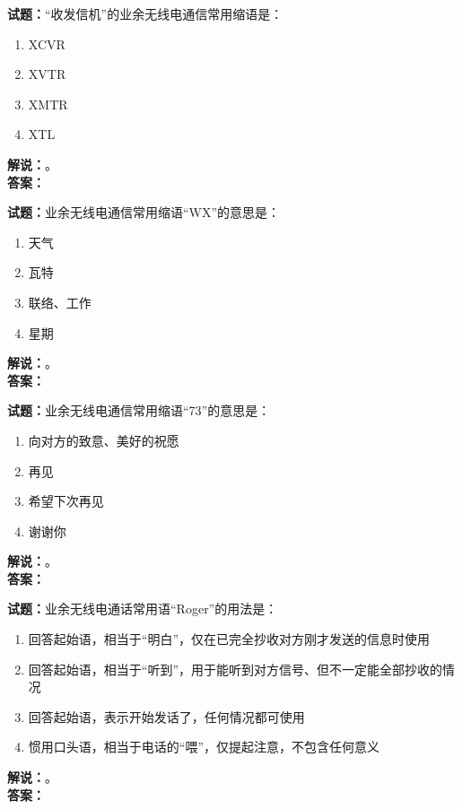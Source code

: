 \documentclass{ctexbook}
\begin{document}
\bigskip




\noindent\textbf{试题：}“收发信机”的业余无线电通信常用缩语是：
\begin{enumerate}[leftmargin=3em]
\item XCVR
\item XVTR
\item XMTR
\item XTL
\end{enumerate}
\noindent\textbf{解说：}\textbf{}。\\\noindent\textbf{答案：}

\bigskip




\noindent\textbf{试题：}业余无线电通信常用缩语“WX”的意思是：
\begin{enumerate}[leftmargin=3em]
\item 天气
\item 瓦特
\item 联络、工作
\item 星期
\end{enumerate}
\noindent\textbf{解说：}\textbf{}。\\\noindent\textbf{答案：}

\bigskip




\noindent\textbf{试题：}业余无线电通信常用缩语“73”的意思是：
\begin{enumerate}[leftmargin=3em]
\item 向对方的致意、美好的祝愿
\item 再见
\item 希望下次再见
\item 谢谢你
\end{enumerate}
\noindent\textbf{解说：}\textbf{}。\\\noindent\textbf{答案：}

\bigskip




\noindent\textbf{试题：}业余无线电通话常用语“Roger”的用法是：
\begin{enumerate}[leftmargin=3em]
\item 回答起始语，相当于“明白”，仅在已完全抄收对方刚才发送的信息时使用
\item 回答起始语，相当于“听到”，用于能听到对方信号、但不一定能全部抄收的情况
\item 回答起始语，表示开始发话了，任何情况都可使用
\item 惯用口头语，相当于电话的“喂”，仅提起注意，不包含任何意义
\end{enumerate}
\noindent\textbf{解说：}\textbf{}。\\\noindent\textbf{答案：}
\end{document}
